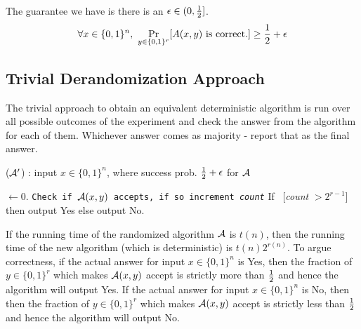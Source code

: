 \begin{minipage}{0.4\linewidth}
\end{minipage}
\begin{minipage}{0.05\linewidth}
~
\end{minipage}
\begin{minipage}{0.5\linewidth}
\vspace{-7mm}
The guarantee we have is there is an $\epsilon \in (0,\frac{1}{2}]$.
\vspace{-3mm}
$$\forall x \in \{0,1\}^n,~\Pr_{y \in \{0,1\}^r} [A(x,y) \textrm{ is correct.}] \ge \frac{1}{2}+\epsilon $$
\end{minipage}
\vspace{3mm}

\subsection{Trivial Derandomization Approach}
\noindent The trivial approach to obtain an equivalent deterministic algorithm is run over all possible outcomes of the experiment and check the answer from the algorithm for each of them. Whichever answer comes as majority - report that as the final answer.

\begin{algorithm}
\label{alg:trivial-derand}
\caption{(${\cal{A}'}$) : input $x \in \{0,1\}^n$, where success prob. $\frac{1}{2}+\epsilon$ for ${\cal{A}}$} 
\begin{algorithmic}[1]
 $\gets 0$. 
	\State \texttt{Check if ${\cal{A}}(x,y)$ accepts, if so increment {\em count}}
\EndFor
\State If ~[{\em count} $> 2^{r-1}$]~ then output {\sc Yes} else output {\sc No}.
\end{algorithmic}
\end{algorithm}

If the running time of the randomized algorithm ${\cal{A}}$ is $t(n)$, then the running time of the new algorithm (which is deterministic) is $t(n)2^{r(n)}$. To argue correctness, if the actual answer for input $x \in \{0,1\}^n$ is {\sc Yes}, then the fraction of $y \in \{0,1\}^r$ which makes ${\cal{A}}(x,y)$ accept is strictly more than $\frac{1}{2}$ and hence the algorithm will output {\sc Yes}. If the actual answer for input $x \in \{0,1\}^n$ is {\sc No}, then then the fraction of $y \in \{0,1\}^r$ which makes ${\cal{A}}(x,y)$ accept is strictly less than $\frac{1}{2}$ and hence the algorithm will output {\sc No}.


